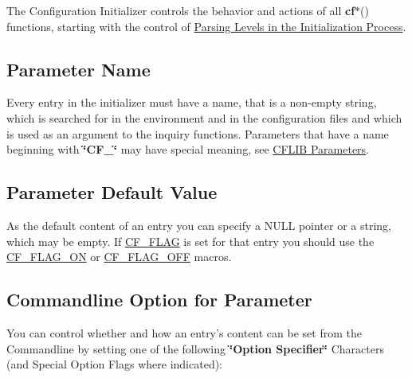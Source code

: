 The Configuration Initializer controls the behavior and actions of all {\bfseries cf$\ast$}() functions, starting with the control of \hyperlink{config_levels_initialization_process}{Parsing Levels in the Initialization Process}.\hypertarget{config_initializer_parameter_name}{}\subsection{Parameter Name}\label{config_initializer_parameter_name}
Every entry in the initializer must have a name, that is a non-\/empty string, which is searched for in the environment and in the configuration files and which is used as an argument to the inquiry functions. Parameters that have a name beginning with {\bfseries \char`\"{}\-C\-F\-\_\-\char`\"{}} may have special meaning, see \hyperlink{parameter_types_cflib_parameters}{C\-F\-L\-I\-B Parameters}.\hypertarget{config_initializer_parameter_default}{}\subsection{Parameter Default Value}\label{config_initializer_parameter_default}
As the default content of an entry you can specify a {\ttfamily N\-U\-L\-L} pointer or a string, which may be empty. If \hyperlink{group__special__options__mask_ga1d1f1d1b6eac6b5d9970102318ab2667}{C\-F\-\_\-\-F\-L\-A\-G} is set for that entry you should use the \hyperlink{group__cflib__core_ga355c714f2912ac336b8b03468c978d8c}{C\-F\-\_\-\-F\-L\-A\-G\-\_\-\-O\-N} or \hyperlink{group__cflib__core_ga7010abac2c80c121772da4d9c03332ee}{C\-F\-\_\-\-F\-L\-A\-G\-\_\-\-O\-F\-F} macros.\hypertarget{config_initializer_parameter_option}{}\subsection{Commandline Option for Parameter}\label{config_initializer_parameter_option}
You can control whether and how an entry's content can be set from the Commandline by setting one of the following {\bfseries \char`\"{}\-Option Specifier\char`\"{}} Characters (and Special Option Flags where indicated)\-:

